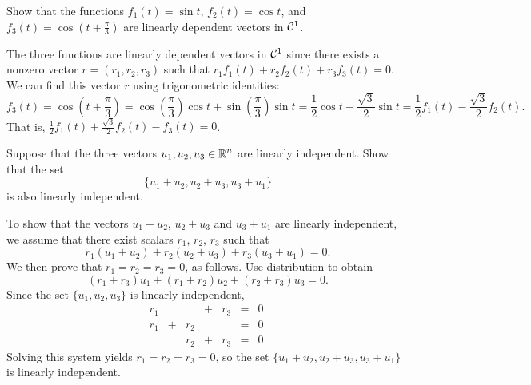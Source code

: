 \documentclass{ximera}
\begin{document}
\begin{exercise} \label{c5.4.6}
Show that the functions $f_1(t) = \sin t$, $f_2(t)=\cos t$, and
$f_3(t)=\cos\left(t+\frac{\pi}{3}\right)$ are linearly dependent
vectors in ${\cal C}^1$.

\begin{solution}

The three functions are linearly dependent vectors in ${\cal C}^1$ since
there exists a nonzero vector $r = (r_1,r_2,r_3)$ such that
$r_1f_1(t) + r_2f_2(t) + r_3f_3(t) = 0$.  We can find this vector $r$
using trigonometric identities:
\[ f_3(t) = \cos\left(t + \frac{\pi}{3}\right) =
\cos\left(\frac{\pi}{3}\right)\cos t + \sin\left(\frac{\pi}{3}\right)\sin t
= \frac{1}{2}\cos t - \frac{\sqrt{3}}{2}\sin t =
\frac{1}{2}f_1(t) - \frac{\sqrt{3}}{2}f_2(t). \]
That is, $\frac{1}{2}f_1(t) + \frac{\sqrt{3}}{2}f_2(t) - f_3(t) = 0$.

\end{solution}
\end{exercise}

\begin{exercise} \label{c5.4.7}
Suppose that the three vectors $u_1,u_2,u_3\in\mbox{$\Bbb{R}$}^n$ are linearly
independent.  Show that the set
\[
\{u_1+u_2, u_2+u_3,u_3+u_1\}
\]
is also linearly independent.

\begin{solution}

To show that the vectors $u_1 + u_2$, $u_2 + u_3$ and $u_3 + u_1$
are linearly independent, we assume that there exist scalars $r_1$,
$r_2$, $r_3$ such that
\[ r_1(u_1 + u_2) + r_2(u_2 + u_3) + r_3(u_3 + u_1) = 0. \]
We then prove that $r_1 = r_2 = r_3 = 0$, as follows.
Use distribution to obtain
\[ (r_1 + r_3)u_1 + (r_1 + r_2)u_2 + (r_2 + r_3)u_3 = 0. \]
Since the set $\{u_1,u_2,u_3\}$ is linearly independent,
\[ \begin{array}{rrrrrcl}
r_1 & & & + & r_3 & = & 0 \\
r_1 & + & r_2 & & & = & 0 \\
& & r_2 & + & r_3 & = & 0. \end{array} \]
Solving this system yields $r_1 = r_2 = r_3 = 0$,
so the set $\{u_1 + u_2,u_2 + u_3,u_3 + u_1\}$ is linearly
independent.

\end{solution}
\end{exercise}

\CEXER
\end{document}

